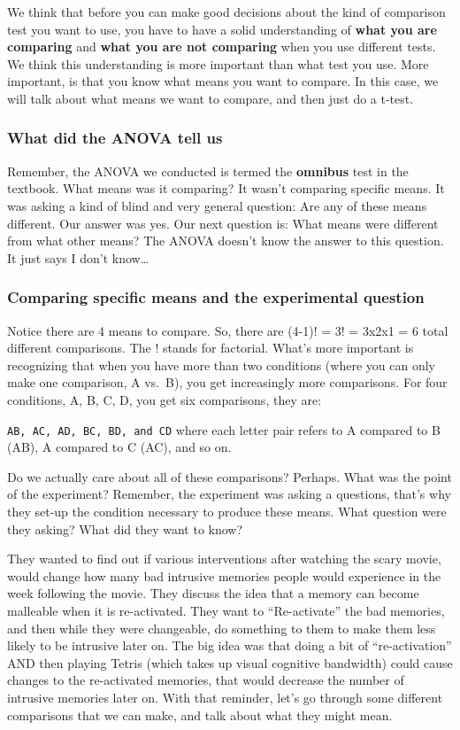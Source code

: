 \documentclass[]{book}
\begin{document}
We think that before you can make good decisions about the kind of
comparison test you want to use, you have to have a solid understanding
of \textbf{what you are comparing} and \textbf{what you are not
comparing} when you use different tests. We think this understanding is
more important than what test you use. More important, is that you know
what means you want to compare. In this case, we will talk about what
means we want to compare, and then just do a t-test.

\subsubsection{What did the ANOVA tell
us}\label{what-did-the-anova-tell-us}

Remember, the ANOVA we conducted is termed the \textbf{omnibus} test in
the textbook. What means was it comparing? It wasn't comparing specific
means. It was asking a kind of blind and very general question: Are any
of these means different. Our answer was yes. Our next question is: What
means were different from what other means? The ANOVA doesn't know the
answer to this question. It just says I don't know\ldots{}

\subsubsection{Comparing specific means and the experimental
question}\label{comparing-specific-means-and-the-experimental-question}

Notice there are 4 means to compare. So, there are (4-1)! = 3! = 3x2x1 =
6 total different comparisons. The ! stands for factorial. What's more
important is recognizing that when you have more than two conditions
(where you can only make one comparison, A vs.~B), you get increasingly
more comparisons. For four conditions, A, B, C, D, you get six
comparisons, they are:

\texttt{AB,\ AC,\ AD,\ BC,\ BD,\ and\ CD} where each letter pair refers
to A compared to B (AB), A compared to C (AC), and so on.

Do we actually care about all of these comparisons? Perhaps. What was
the point of the experiment? Remember, the experiment was asking a
questions, that's why they set-up the condition necessary to produce
these means. What question were they asking? What did they want to know?

They wanted to find out if various interventions after watching the
scary movie, would change how many bad intrusive memories people would
experience in the week following the movie. They discuss the idea that a
memory can become malleable when it is re-activated. They want to
``Re-activate'' the bad memories, and then while they were changeable,
do something to them to make them less likely to be intrusive later on.
The big idea was that doing a bit of ``re-activation'' AND then playing
Tetris (which takes up visual cognitive bandwidth) could cause changes
to the re-activated memories, that would decrease the number of
intrusive memories later on. With that reminder, let's go through some
different comparisons that we can make, and talk about what they might
mean.
\end{document}
